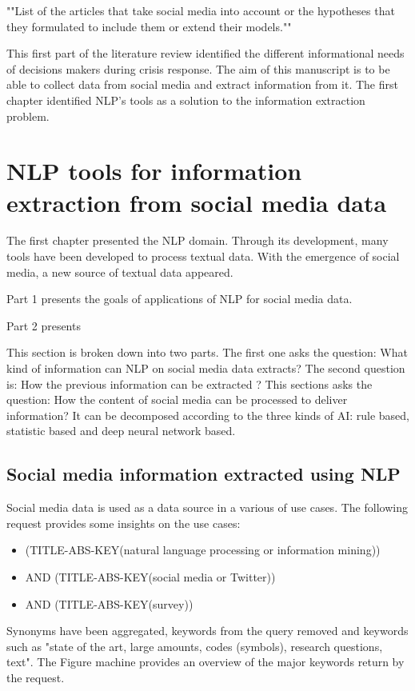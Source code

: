""List of the articles that take social media into account or the hypotheses that they formulated to include them or extend their models.""

This first part of the literature review identified the different informational needs of decisions makers during crisis response.
The aim of this manuscript is to be able to collect data from social media and extract information from it.
The first chapter identified NLP's tools as a solution to the information extraction problem.

\section{NLP tools for information extraction from social media data}
The first chapter presented the NLP domain.
Through its development, many tools have been developed to process textual data.
With the emergence of social media, a new source of textual data appeared.

Part 1 presents the goals of applications of NLP for social media data.

Part 2 presents

This section is broken down into two parts.
The first one asks the question: What kind of information can NLP on social media data extracts?
The second question is: How the previous information can be extracted ?
This sections asks the question: How the content of social media can be processed to deliver information?
It can be decomposed according to the three kinds of AI: rule based, statistic based and deep neural network based.



\subsection{Social media information extracted using NLP}
Social media data is used as a data source in a various of use cases.
The following request provides some insights on the use cases:
\begin{itemize}
    \item (TITLE-ABS-KEY({natural language processing} or {information mining}))
    \item AND (TITLE-ABS-KEY({social media} or Twitter))
    \item AND (TITLE-ABS-KEY(survey))
\end{itemize}
Synonyms have been aggregated, keywords from the query removed and keywords such as "state of the art, large amounts, codes (symbols), research questions, text".
The Figure machine provides an overview of the major keywords return by the request.


